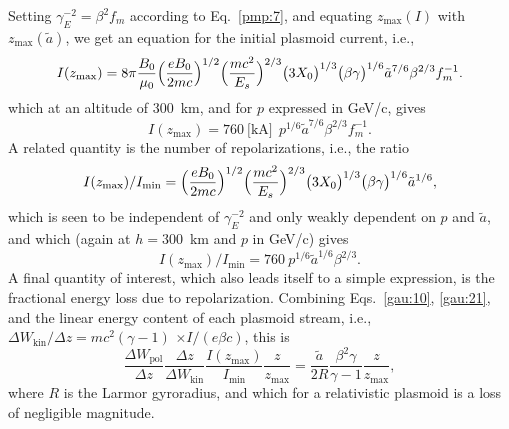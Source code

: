 \documentclass [12pt,a4paper,     ]{report} %
\begin{document}
Setting $\gamma_E^{-2}=\beta^2f_m$ according to Eq.~\eqref{pmp:7}, and equating $z_{\text{max}}(I)$ with $z_{\text{max}}({\tilde{a}})$, we get an equation for the initial plasmoid current, i.e.,
%
\begin{equation}\label{gau:18} %
    I(z_{\text{max}}) =
              8 \pi \frac{B_0}{\mu_0}
              \Bigl( \frac{eB_0}{2mc}  \Bigr)^{1/2}
              \Bigl( \frac{mc^2}{E_s}\Bigr)^{2/3}
              \bigl( 3X_0            \bigr)^{1/3}
              \bigl( \beta\gamma     \bigr)^{1/6}
                     \tilde{a}^{7/6}
                     \beta^{2/3}
                      f_m^{-1}.
\end{equation}
%
which at an altitude of 300~km, and for $p$ expressed in  GeV/c, gives
%
\begin{equation}\label{gau:19} %
    I(z_{\text{max}}) = 760~ \text{[kA]} ~~ p^{1/6}
                     \tilde{a}^{7/6}
                     \beta^{2/3}
                      f_m^{-1}.
\end{equation}
%
A related quantity is the number of repolarizations, i.e., the ratio
%
\begin{equation}\label{gau:20} %
    I(z_{\text{max}}) /I_{\text{min}} =
              \Bigl( \frac{eB_0}{2mc}  \Bigr)^{1/2}
              \Bigl( \frac{mc^2}{E_s}\Bigr)^{2/3}
              \bigl( 3X_0            \bigr)^{1/3}
              \bigl( \beta\gamma     \bigr)^{1/6}
                     \tilde{a}^{1/6},
\end{equation}
%
which is seen to be independent of $\gamma_E^{-2}$ and only weakly dependent on $p$ and $\tilde{a}$, and which (again at $h=300$~km and $p$ in GeV/c) gives
%
\begin{equation}\label{gau:21} %
    I(z_{\text{max}}) /I_{\text{min}} = 760~  p^{1/6}
                     \tilde{a}^{1/6}
                     \beta^{2/3}.
\end{equation}
%
A final quantity of interest, which also leads itself to a simple expression, is the fractional energy loss due to repolarization.  Combining Eqs.~\eqref{gau:10}, \eqref{gau:21}, and the linear energy content of each plasmoid stream, i.e., ${\Delta W_{\text{kin}}}/{\Delta z}=mc^2(\gamma-1)$ $\times I/(e\beta c)$, this is
%
\begin{equation}\label{gau:22} %
     \frac{\Delta W_{\text{pol}}}{\Delta z}
     \frac{\Delta z}{\Delta W_{\text{kin}}}
     \frac{I(z_{\text{max}})}{I_{\text{min}}}
     \frac{z}{z_{\text{max}}} = 
     \frac{\tilde{a}}{2R}
     \frac{\beta^2\gamma}{\gamma-1}
     \frac{z}{z_{\text{max}}},
\end{equation}
%
where $R$ is the Larmor gyroradius, and which for a relativistic plasmoid is a loss of negligible magnitude.
\end{document}
